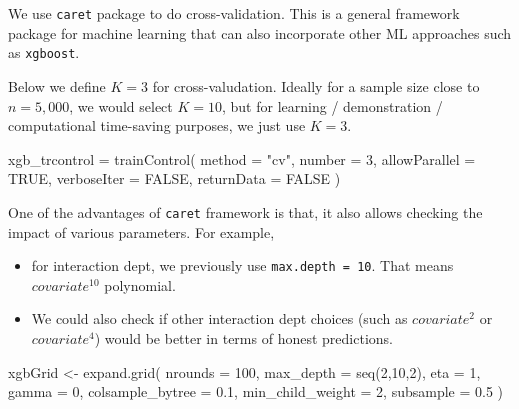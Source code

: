 \documentclass[
]{book}
\newenvironment{Shaded}{\begin{snugshade}}{\end{snugshade}}
\newcommand{\AttributeTok}[1]{\textcolor[rgb]{0.77,0.63,0.00}{#1}}
\newcommand{\ConstantTok}[1]{\textcolor[rgb]{0.00,0.00,0.00}{#1}}
\newcommand{\DecValTok}[1]{\textcolor[rgb]{0.00,0.00,0.81}{#1}}
\newcommand{\FloatTok}[1]{\textcolor[rgb]{0.00,0.00,0.81}{#1}}
\newcommand{\FunctionTok}[1]{\textcolor[rgb]{0.00,0.00,0.00}{#1}}
\newcommand{\NormalTok}[1]{#1}
\newcommand{\OtherTok}[1]{\textcolor[rgb]{0.56,0.35,0.01}{#1}}
\newcommand{\SpecialCharTok}[1]{\textcolor[rgb]{0.00,0.00,0.00}{#1}}
\newcommand{\StringTok}[1]{\textcolor[rgb]{0.31,0.60,0.02}{#1}}
\providecommand{\tightlist}{%
  \setlength{\itemsep}{0pt}\setlength{\parskip}{0pt}}
\begin{document}
We use \texttt{caret} package to do cross-validation. This is a general framework package for machine learning that can also incorporate other ML approaches such as \texttt{xgboost}.

\begin{Shaded}
\end{Shaded}

Below we define \(K = 3\) for cross-valudation. Ideally for a sample size close to \(n=5,000\), we would select \(K=10\), but for learning / demonstration / computational time-saving purposes, we just use \(K = 3\).

\begin{Shaded}
\begin{Highlighting}[]
\NormalTok{xgb\_trcontrol }\OtherTok{=} \FunctionTok{trainControl}\NormalTok{(}
  \AttributeTok{method =} \StringTok{"cv"}\NormalTok{,}
  \AttributeTok{number =} \DecValTok{3}\NormalTok{,  }
  \AttributeTok{allowParallel =} \ConstantTok{TRUE}\NormalTok{,}
  \AttributeTok{verboseIter =} \ConstantTok{FALSE}\NormalTok{,}
  \AttributeTok{returnData =} \ConstantTok{FALSE}
\NormalTok{)}
\end{Highlighting}
\end{Shaded}

One of the advantages of \texttt{caret} framework is that, it also allows checking the impact of various parameters. For example,

\begin{itemize}
\tightlist
\item
  for interaction dept, we previously use \texttt{max.depth\ =\ 10}. That means \(covariate^{10}\) polynomial.
\item
  We could also check if other interaction dept choices (such as \(covariate^{2}\) or \(covariate^{4}\)) would be better in terms of honest predictions.
\end{itemize}

\begin{Shaded}
\begin{Highlighting}[]
\NormalTok{xgbGrid }\OtherTok{\textless{}{-}} \FunctionTok{expand.grid}\NormalTok{(}
  \AttributeTok{nrounds =} \DecValTok{100}\NormalTok{, }
  \AttributeTok{max\_depth =} \FunctionTok{seq}\NormalTok{(}\DecValTok{2}\NormalTok{,}\DecValTok{10}\NormalTok{,}\DecValTok{2}\NormalTok{),}
  \AttributeTok{eta =} \DecValTok{1}\NormalTok{,}
  \AttributeTok{gamma =} \DecValTok{0}\NormalTok{,}
  \AttributeTok{colsample\_bytree =} \FloatTok{0.1}\NormalTok{,}
  \AttributeTok{min\_child\_weight =} \DecValTok{2}\NormalTok{,}
  \AttributeTok{subsample =} \FloatTok{0.5} 
\NormalTok{)}
\end{Highlighting}
\end{Shaded}
\end{document}
